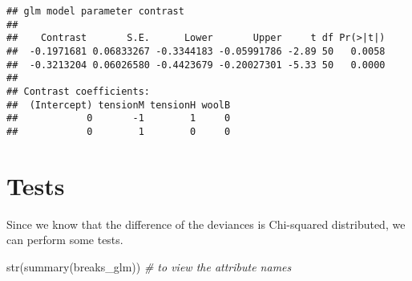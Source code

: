 \documentclass[
  oneside]{book}
\newenvironment{Shaded}{\begin{snugshade}}{\end{snugshade}}
\newcommand{\CommentTok}[1]{\textcolor[rgb]{0.56,0.35,0.01}{\textit{#1}}}
\newcommand{\FunctionTok}[1]{\textcolor[rgb]{0.00,0.00,0.00}{#1}}
\newcommand{\NormalTok}[1]{#1}
\begin{document}
\begin{verbatim}
## glm model parameter contrast
## 
##    Contrast       S.E.      Lower       Upper     t df Pr(>|t|)
##  -0.1971681 0.06833267 -0.3344183 -0.05991786 -2.89 50   0.0058
##  -0.3213204 0.06026580 -0.4423679 -0.20027301 -5.33 50   0.0000
## 
## Contrast coefficients:
##  (Intercept) tensionM tensionH woolB
##            0       -1        1     0
##            0        1        0     0
\end{verbatim}

\hypertarget{tests}{%
\section{Tests}\label{tests}}

Since we know that the difference of the deviances
is Chi-squared distributed, we can perform some tests.

\begin{Shaded}
\begin{Highlighting}[]
\FunctionTok{str}\NormalTok{(}\FunctionTok{summary}\NormalTok{(breaks\_glm)) }\CommentTok{\# to view the attribute names}
\end{Highlighting}
\end{Shaded}
\end{document}
